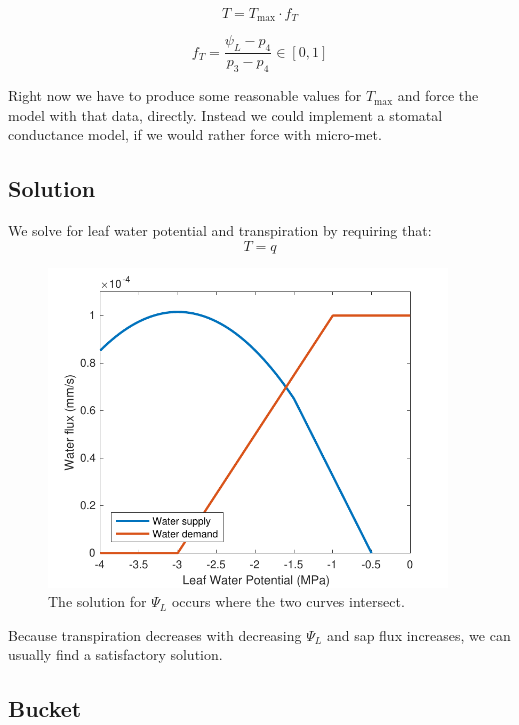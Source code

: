 \documentclass[11pt]{article}
\begin{document}
\begin{equation}
T = T_\text{max}\cdot f_T
\end{equation}

\begin{equation}
f_T = \dfrac{\psi_L - p_4}{p_3 - p_4} \in \left[0,1\right]
\end{equation}

Right now we have to produce some reasonable values for $T_\text{max}$ and force the model with that data, directly. Instead we could implement a stomatal conductance model, if we would rather force with micro-met.

\clearpage
\subsection{Solution}

We solve for leaf water potential and transpiration by requiring that: 
\begin{equation}
T = q
\end{equation}

\begin{figure}[h]
\centering
\includegraphics[width=25pc]{../figs/spac_solution}
\caption{The solution for $\Psi_L$ occurs where the two curves intersect.}
\label{fig:soln}
\end{figure}

Because transpiration decreases with decreasing $\Psi_L$ and sap flux increases, we can usually find a satisfactory solution. 

\clearpage
\subsection{Bucket}
\end{document}
